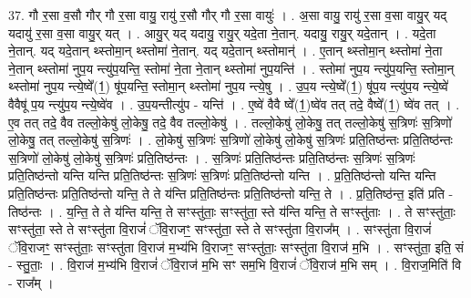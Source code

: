 \documentclass[17pt]{extarticle}
\begin{document}
37. गौ र॒सा व॒सौ गौर् गौ र॒सा वायु॒ रायु॑ र॒सौ गौर् गौ र॒सा वायुः॑ । . अ॒सा वायु॒ रायु॑ र॒सा व॒सा वायु॒र् यद् यदायु॑ र॒सा व॒सा वायु॒र् यत् । . आयु॒र् यद् यदायु॒ रायु॒र् यदे॒ता ने॒तान्. यदायु॒ रायु॒र् यदे॒तान् । . यदे॒ता ने॒तान्. यद् यदे॒तान् थ्स्तोमा॒न् थ्स्तोमा॑ ने॒तान्. यद् यदे॒तान् थ्स्तोमान्॑ । . ए॒तान् थ्स्तोमा॒न् थ्स्तोमा॑ ने॒ता ने॒तान् थ्स्तोमा॑ नुप॒य न्त्यु॑प॒यन्ति॒ स्तोमा॑ ने॒ता ने॒तान् थ्स्तोमा॑ नुप॒यन्ति॑ । . स्तोमा॑ नुप॒य न्त्यु॑प॒यन्ति॒ स्तोमा॒न् थ्स्तोमा॑ नुप॒य न्त्ये॒ष्वे᳚(1॒) षू॑प॒यन्ति॒ स्तोमा॒न् थ्स्तोमा॑ नुप॒य न्त्ये॒षु । . उ॒प॒य न्त्ये॒ष्वे᳚(1॒) षू॑प॒य न्त्यु॑प॒य न्त्ये॒ष्वे॑ वैवैषू॑ प॒य न्त्यु॑प॒य न्त्ये॒ष्वे॑व । . उ॒प॒यन्तीत्यु॑प - यन्ति॑ । . ए॒ष्वे॑ वैवै ष्वे᳚(1॒)ष्वे॑व तत् तदे॒ वैष्वे᳚(1॒) ष्वे॑व तत् । . ए॒व तत् तदे॒ वैव तल्लो॒केषु॑ लो॒केषु॒ तदे॒ वैव तल्लो॒केषु॑ । . तल्लो॒केषु॑ लो॒केषु॒ तत् तल्लो॒केषु॑ स॒त्रिणः॑ स॒त्रिणो॑ लो॒केषु॒ तत् तल्लो॒केषु॑ स॒त्रिणः॑ । . लो॒केषु॑ स॒त्रिणः॑ स॒त्रिणो॑ लो॒केषु॑ लो॒केषु॑ स॒त्रिणः॑ प्रति॒तिष्ठ॑न्तः प्रति॒तिष्ठ॑न्तः स॒त्रिणो॑ लो॒केषु॑ लो॒केषु॑ स॒त्रिणः॑ प्रति॒तिष्ठ॑न्तः । . स॒त्रिणः॑ प्रति॒तिष्ठ॑न्तः प्रति॒तिष्ठ॑न्तः स॒त्रिणः॑ स॒त्रिणः॑ प्रति॒तिष्ठ॑न्तो यन्ति यन्ति प्रति॒तिष्ठ॑न्तः स॒त्रिणः॑ स॒त्रिणः॑ प्रति॒तिष्ठ॑न्तो यन्ति । . प्र॒ति॒तिष्ठ॑न्तो यन्ति यन्ति प्रति॒तिष्ठ॑न्तः प्रति॒तिष्ठ॑न्तो यन्ति॒ ते ते य॑न्ति प्रति॒तिष्ठ॑न्तः प्रति॒तिष्ठ॑न्तो यन्ति॒ ते । . प्र॒ति॒तिष्ठ॑न्त॒ इति॑ प्रति - तिष्ठ॑न्तः । . य॒न्ति॒ ते ते य॑न्ति यन्ति॒ ते सꣳस्तु॑ताः॒ सꣳस्तु॑ता॒ स्ते य॑न्ति यन्ति॒ ते सꣳस्तु॑ताः । . ते सꣳस्तु॑ताः॒ सꣳस्तु॑ता॒ स्ते ते सꣳस्तु॑ता वि॒राजं॑ ॅवि॒राजꣳ॒॒ सꣳस्तु॑ता॒ स्ते ते सꣳस्तु॑ता वि॒राज᳚म् । . सꣳस्तु॑ता वि॒राजं॑ ॅवि॒राजꣳ॒॒ सꣳस्तु॑ताः॒ सꣳस्तु॑ता वि॒राज॑ म॒भ्य॑भि वि॒राजꣳ॒॒ सꣳस्तु॑ताः॒ सꣳस्तु॑ता वि॒राज॑ म॒भि । . सꣳस्तु॑ता॒ इति॒ सं - स्तु॒ताः॒ । . वि॒राज॑ म॒भ्य॑भि वि॒राजं॑ ॅवि॒राज॑ म॒भि सꣳ सम॒भि वि॒राजं॑ ॅवि॒राज॑ म॒भि सम् । . वि॒राज॒मिति॑ वि - राज᳚म् । \newline
\pagebreak
{}
\end{document}
